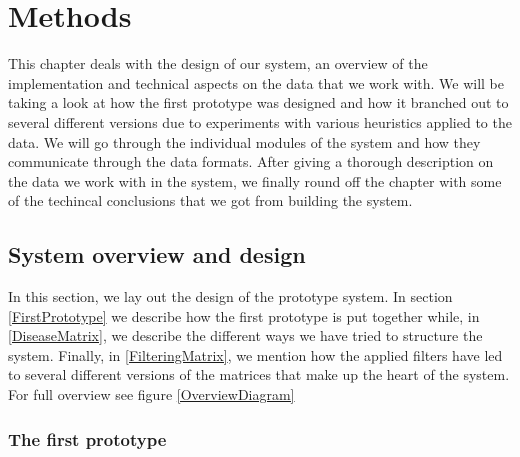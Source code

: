 \chapter{Methods\label{Methods}}

This chapter deals with the design of our system, an overview of the
implementation and technical aspects on the data that we work with. We
will be taking a look at how the first prototype was designed and how
it branched out to several different versions due to experiments with
various heuristics applied to the data. We will go through the
individual modules of the system and how they communicate through the
data formats. After giving a thorough description on the data we work
with in the system, we finally round off the chapter with some of the
techincal conclusions that we got from building the system.

\section{System overview and design\label{SystemOverviewAndDesign}}

In this section, we lay out the design of the prototype system. In
section \ref{FirstPrototype} we describe how the first prototype is
put together while, in \ref{DiseaseMatrix}, we describe the different ways we have
tried to structure the system. Finally, in \ref{FilteringMatrix}, we mention how the
applied filters have led to several different versions of the matrices
that make up the heart of the system. For full overview see figure
\ref{OverviewDiagram}

\subsection{The first prototype\label{FirstPrototype}}

